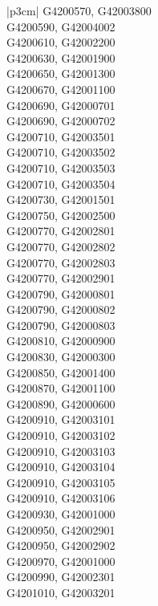 \begin{customLongTable}{ |p{3cm}| }
G4200570, G42003800 \\ \hline
G4200590, G42004002 \\ \hline
G4200610, G42002200 \\ \hline
G4200630, G42001900 \\ \hline
G4200650, G42001300 \\ \hline
G4200670, G42001100 \\ \hline
G4200690, G42000701 \\ \hline
G4200690, G42000702 \\ \hline
G4200710, G42003501 \\ \hline
G4200710, G42003502 \\ \hline
G4200710, G42003503 \\ \hline
G4200710, G42003504 \\ \hline
G4200730, G42001501 \\ \hline
G4200750, G42002500 \\ \hline
G4200770, G42002801 \\ \hline
G4200770, G42002802 \\ \hline
G4200770, G42002803 \\ \hline
G4200770, G42002901 \\ \hline
G4200790, G42000801 \\ \hline
G4200790, G42000802 \\ \hline
G4200790, G42000803 \\ \hline
G4200810, G42000900 \\ \hline
G4200830, G42000300 \\ \hline
G4200850, G42001400 \\ \hline
G4200870, G42001100 \\ \hline
G4200890, G42000600 \\ \hline
G4200910, G42003101 \\ \hline
G4200910, G42003102 \\ \hline
G4200910, G42003103 \\ \hline
G4200910, G42003104 \\ \hline
G4200910, G42003105 \\ \hline
G4200910, G42003106 \\ \hline
G4200930, G42001000 \\ \hline
G4200950, G42002901 \\ \hline
G4200950, G42002902 \\ \hline
G4200970, G42001000 \\ \hline
G4200990, G42002301 \\ \hline
G4201010, G42003201 \\ \hline

\end{customLongTable}
